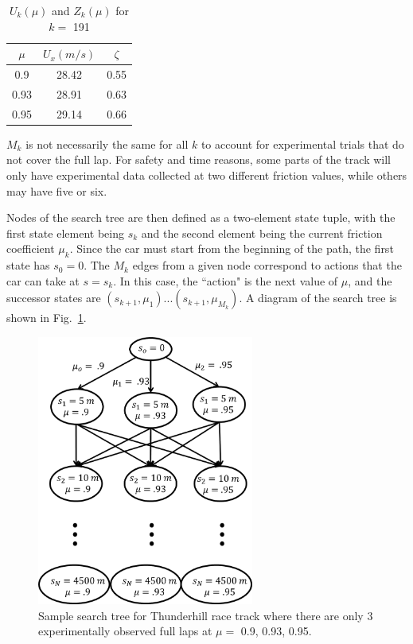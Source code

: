 \documentclass[9pt,shortpaper,twoside,web]{ieeecolor}
\begin{document}
{{{\begin{table}[h]
\begin{center}
\caption{$U_k(\mu)$ and $Z_k(\mu)$ for $k =$ 191}\label{tb:laptimes}
\begin{tabular}{ccc}
$\mu $&$ U_x(m/s) $& $\zeta $\\\hline
0.9 & 28.42 & 0.55\\
0.93& 28.91 & 0.63\\
0.95& 29.14 & 0.66\\\hline
\end{tabular}
\end{center}
\end{table} 
 $M_k$ is not necessarily the same for all $k$ to account for experimental trials that do not cover the full lap. For safety and time
 reasons, some parts of the track will only have experimental data collected at two different friction values, while others may have five or six.

 Nodes of the search tree are then defined as a two-element state tuple, with the first state element being $s_k$ and the second element being the current
 friction coefficient $\mu_k$. Since the car must start from the beginning of the path, the first state has $s_0 = 0$.
 The $M_k$ edges from a given node correspond to actions that the car can take at $s = s_k$. In this case, the ``action" is the next value of $\mu$,
 and the successor states are $(s_{k+1}, \mu_1) ... (s_{k+1}, \mu_{M_k})$. A diagram of the search tree is shown in Fig.~\ref{fig:stree}.

\begin{figure}
\centering
\includegraphics[width=2.8in]{figures/searchTree.png}
\caption{Sample search tree for Thunderhill race track where there are only 3 experimentally observed full laps at $\mu =$ 0.9, 0.93, 0.95.}
\label{fig:stree}
\end{figure} 

}}}
\end{document}
